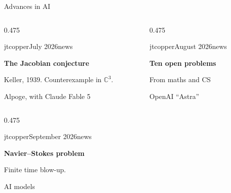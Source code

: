 \documentclass[aspectratio=169,10pt]{beamer}
\newcommand{\jtbody}{\small}
\newcommand{\jtmeta}{\footnotesize}
\begin{document}
\begin{frame}{Advances in AI}
  \vfill
  \begin{columns}[T,onlytextwidth]

    \begin{column}{0.475\textwidth}
      \begin{jtblockh}[top=6pt,bottom=6pt]{jtcopper}{July 2026}{news}
        {\fontsize{14}{18}\selectfont\bfseries\color{jtslate}
          The Jacobian conjecture\par}
        \vspace{4pt}
        {\jtbody\color{jtslate}Keller, 1939. Counterexample in $\mathbb{C}^{3}$.\par}
        \vfill
        {\jtmeta\color{jtgrey}Alpoge, with Claude Fable 5\par}
      \end{jtblockh}
    \end{column}

    \begin{column}{0.475\textwidth}
      \begin{jtblockh}[top=6pt,bottom=6pt]{jtcopper}{August 2026}{news}
        {\fontsize{14}{18}\selectfont\bfseries\color{jtslate}
          Ten open problems\par}
        \vspace{4pt}
        {\jtbody\color{jtslate}From maths and CS\par}
        \vfill
        {\jtmeta\color{jtgrey}OpenAI ``Astra''\par}
      \end{jtblockh}
    \end{column}

  \end{columns}
  \vspace{2pt}
  \begin{columns}[T,onlytextwidth]

    \begin{column}{0.475\textwidth}
      \begin{jtblockh}[top=6pt,bottom=6pt]{jtcopper}{September 2026}{news}
        {\fontsize{14}{18}\selectfont\bfseries\color{jtslate}
          Navier--Stokes problem\par}
        \vspace{4pt}
        {\jtbody\color{jtslate}Finite time blow-up.\par}
        \vfill
        {\jtmeta\color{jtgrey}AI models\par}
      \end{jtblockh}
    \end{column}


\end{columns}
\end{frame}
\end{document}
